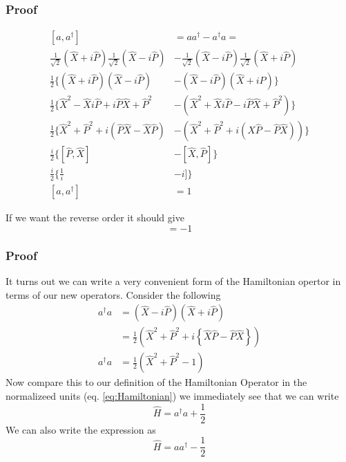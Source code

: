 \documentclass{article}
\newcommand{\be}{\begin{equation}}
\newcommand{\ee}{\end{equation}}
\newcommand{\dg}{\dagger}
\begin{document}
\subsubsection*{Proof}
\be
 \begin{split}
     [a,a^\dg] &= aa^\dg - a^\dg a =\\
     \frac{1}{\sqrt{2}} \left(\hat{X} + i\hat{P}\right) \frac{1}{\sqrt{2}} \left(\hat{X} - i\hat{P}\right) &- \frac{1}{\sqrt{2}} \left(\hat{X} - i\hat{P}\right)\frac{1}{\sqrt{2}} \left(\hat{X} + i\hat{P}\right)\\
   \frac{1}{2} \bigg\{ \left(\hat{X} + i\hat{P}\right) \left(\hat{X} - i\hat{P}\right) &- \left(\hat{X} - i\hat{P}\right) \left(\hat{X} + i\hat{P}\right) \bigg\}\\
      \frac{1}{2} \bigg\{\hat{X}^2 - \hat{X}i\hat{P} + i\hat{P}\hat{X} + \hat{P}^2  &- \left(\hat{X}^2 + \hat{X}i\hat{P} - i\hat{P}\hat{X} + \hat{P}^2\right)  \bigg\}\\
        \frac{1}{2} \bigg\{\hat{X}^2 + \hat{P}^2 + i\left(\hat{P}\hat{X} - \hat{X}\hat{P}\right)   &- \left(\hat{X}^2 + \hat{P}^2 + i\left(\hat{X}\hat{P} - \hat{P}\hat{X}\right)\right) \bigg\}\\
        \frac{i}{2} \bigg\{ \left[\hat{P},
        \hat{X}\right] &- \left[\hat{X},
     \hat{P}\right] \bigg\}\\
     \frac{i}{2} \bigg\{ \frac{1}{i} &- i] \bigg\}\\
     [a,a^\dg] &= 1
 \end{split}
 \ee

If we want the reverse order it should give
\be
[a^\dg, a] = -1
\ee
\subsubsection*{Proof}


It turns out we can write a very convenient form of the Hamiltonian opertor in terms of our new operators.
Consider the following
\be
\begin{split}
a^\dg a &= \left(\hat{X} - i\hat{P}\right) \left(\hat{X} + i\hat{P}\right)\\
&= \frac{1}{2}\left(\hat{X}^2 + \hat{P}^2 + i\left\{ \hat{X}\hat{P} - \hat{P}\hat{X}\right\}\right)\\
a^\dg a &=\frac{1}{2}\left(\hat{X}^2 + \hat{P}^2 - 1\right)
\end{split}
\ee
Now compare this to our definition of the Hamiltonian Operator in the normalizeed units (eq. \ref{eq:Hamiltonian}) we immediately see that we can write
\be
\hat{H} = a^\dg a + \frac{1}{2}
\ee
We can also write the expression as 
\be
\hat{H} = aa^\dg - \frac{1}{2}
\ee
\end{document}
